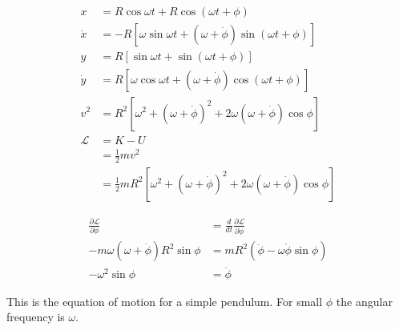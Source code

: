 \documentclass{article}
\begin{document}
\setcounter{subsection}{34}
\subsection{}

\begin{align*}
  x           & = R \cos \omega t + R \cos (\omega t + \phi)                                                        \\
  \dot{x}     & = -R [\omega \sin \omega t + (\omega + \dot{\phi}) \sin (\omega t + \phi)]                          \\
  y           & = R [\sin \omega t + \sin (\omega t + \phi)]                                                        \\
  \dot{y}     & = R [\omega \cos \omega t + (\omega + \dot{\phi}) \cos (\omega t + \phi)]                           \\
  v^2         & = R^2 [\omega^2 + (\omega + \dot{\phi})^2 + 2 \omega (\omega + \dot{\phi}) \cos \phi]               \\
  \mathcal{L} & = K - U                                                                                             \\
              & = \frac{1}{2} m v^2                                                                                 \\
              & = \frac{1}{2} m R^2 [\omega^2 + (\omega + \dot{\phi})^2 + 2 \omega (\omega + \dot{\phi}) \cos \phi]
\end{align*}

\begin{align*}
  \frac{\partial \mathcal{L}}{\partial \phi}    & = \frac{d}{d t} \frac{\partial \mathcal{L}}{\partial \dot{\phi}} \\
  -m \omega (\omega + \dot{\phi}) R^2 \sin \phi & = m R^2 (\ddot{\phi} - \omega \dot{\phi} \sin \phi)              \\
  -\omega^2 \sin \phi                           & = \ddot{\phi}
\end{align*}

This is the equation of motion for a simple pendulum. For small $\phi$ the angular frequency is $\omega$.

\setcounter{subsection}{36}
\subsection{}
\end{document}
